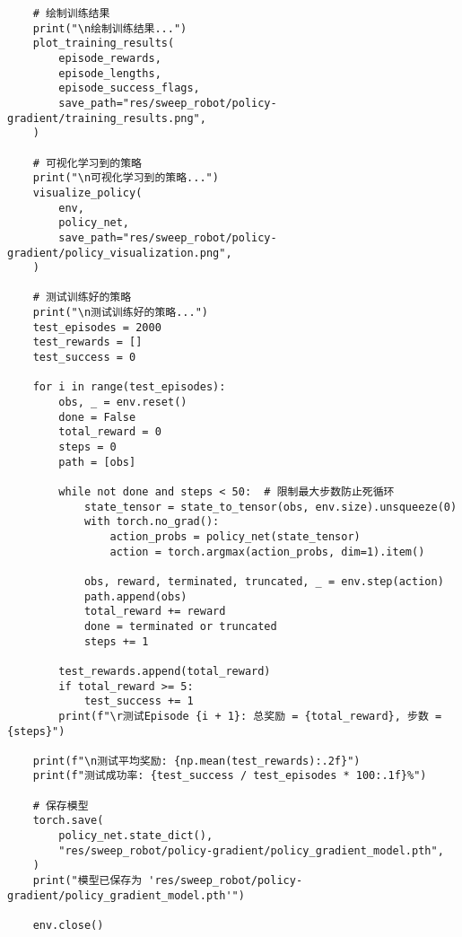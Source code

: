 \begin{verbatim}
    # 绘制训练结果
    print("\n绘制训练结果...")
    plot_training_results(
        episode_rewards,
        episode_lengths,
        episode_success_flags,
        save_path="res/sweep_robot/policy-gradient/training_results.png",
    )

    # 可视化学习到的策略
    print("\n可视化学习到的策略...")
    visualize_policy(
        env,
        policy_net,
        save_path="res/sweep_robot/policy-gradient/policy_visualization.png",
    )

    # 测试训练好的策略
    print("\n测试训练好的策略...")
    test_episodes = 2000
    test_rewards = []
    test_success = 0

    for i in range(test_episodes):
        obs, _ = env.reset()
        done = False
        total_reward = 0
        steps = 0
        path = [obs]

        while not done and steps < 50:  # 限制最大步数防止死循环
            state_tensor = state_to_tensor(obs, env.size).unsqueeze(0)
            with torch.no_grad():
                action_probs = policy_net(state_tensor)
                action = torch.argmax(action_probs, dim=1).item()

            obs, reward, terminated, truncated, _ = env.step(action)
            path.append(obs)
            total_reward += reward
            done = terminated or truncated
            steps += 1

        test_rewards.append(total_reward)
        if total_reward >= 5:
            test_success += 1
        print(f"\r测试Episode {i + 1}: 总奖励 = {total_reward}, 步数 = {steps}")

    print(f"\n测试平均奖励: {np.mean(test_rewards):.2f}")
    print(f"测试成功率: {test_success / test_episodes * 100:.1f}%")

    # 保存模型
    torch.save(
        policy_net.state_dict(),
        "res/sweep_robot/policy-gradient/policy_gradient_model.pth",
    )
    print("模型已保存为 'res/sweep_robot/policy-gradient/policy_gradient_model.pth'")

    env.close()

\end{verbatim}
